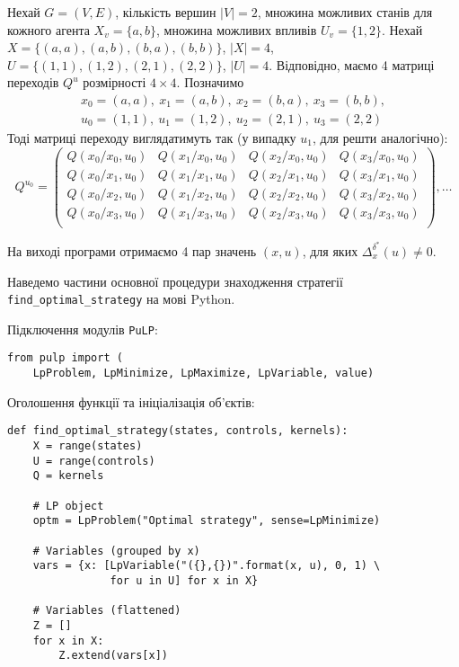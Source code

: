 \documentclass[oneside,14pt]{extarticle}
\begin{document}
\begin{example}
Нехай \(G = (V, E)\), кількість вершин \(|V| = 2\), множина можливих станів для кожного агента \(X_v = \{a, b\}\), множина можливих впливів \(U_v = \{1, 2\}\). Нехай \(X = \{(a, a), (a, b), (b, a), (b, b)\}\), \(|X| = 4\), \(U = \{(1, 1), (1, 2), (2, 1), (2, 2)\}\), \(|U| = 4\). Відповідно, маємо 4 матриці переходів \(Q^u\) розмірності \(4 \times 4\). Позначимо
\begin{gather*}
x_0 = (a, a),\ x_1 = (a, b),\ x_2 = (b, a),\ x_3 = (b, b), \\
u_0 = (1, 1),\ u_1 = (1, 2),\ u_2 = (2, 1),\ u_3 = (2, 2)
\end{gather*}
Тоді матриці переходу виглядатимуть так (у випадку \(u_1\), для решти аналогічно):
\[Q^{u_0} = \left(\begin{matrix}
Q(x_0 / x_0, u_0) & Q(x_1 / x_0, u_0) & Q(x_2 / x_0, u_0) & Q(x_3 / x_0, u_0) \\
Q(x_0 / x_1, u_0) & Q(x_1 / x_1, u_0) & Q(x_2 / x_1, u_0) & Q(x_3 / x_1, u_0) \\
Q(x_0 / x_2, u_0) & Q(x_1 / x_2, u_0) & Q(x_2 / x_2, u_0) & Q(x_3 / x_2, u_0) \\
Q(x_0 / x_3, u_0) & Q(x_1 / x_3, u_0) & Q(x_2 / x_3, u_0) & Q(x_3 / x_3, u_0) \\
\end{matrix}\right), \ldots\]

На виході програми отримаємо 4 пар значень \((x, u)\), для яких \(\Delta_x^{\delta^*}(u) \neq 0\).
\end{example}

Наведемо частини основної процедури знаходження стратегії \texttt{find\_optimal\_strategy} на мові Python.

Підключення модулів \texttt{PuLP}:

\begin{lstlisting}
from pulp import (
    LpProblem, LpMinimize, LpMaximize, LpVariable, value)
\end{lstlisting}

Оголошення функції та ініціалізація об’єктів:
\begin{lstlisting}
def find_optimal_strategy(states, controls, kernels):
    X = range(states)
    U = range(controls)
    Q = kernels
	
    # LP object
    optm = LpProblem("Optimal strategy", sense=LpMinimize)

    # Variables (grouped by x)
    vars = {x: [LpVariable("({},{})".format(x, u), 0, 1) \
                for u in U] for x in X}

    # Variables (flattened)
    Z = []
    for x in X:
        Z.extend(vars[x])
\end{lstlisting}
\end{document}
